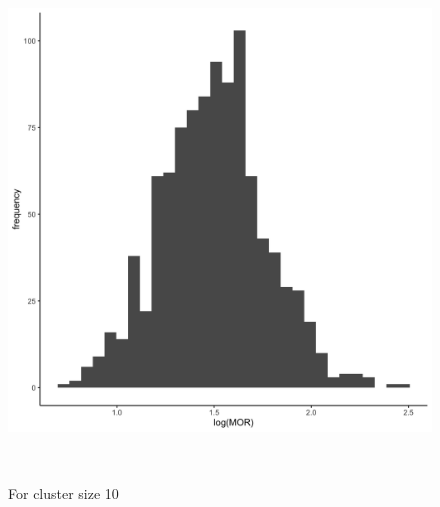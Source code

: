 \documentclass[
  letterpaper,
  DIV=11,
  numbers=noendperiod,
  titlepage]{scrartcl}
\begin{document}
\begin{figure}
\begin{minipage}[t]{0.50\linewidth}
{{\includegraphics{../../plots/two-lvl-ran-int/low-prev/hist_100_10_two_lvl_low_prev.png}

}

\caption{For cluster size 10}

}

\end{minipage}%
\newline
\begin{minipage}[t]{\linewidth}

{\centering 

~

}

\end{minipage}%
\newline
\begin{minipage}[t]{0.50\linewidth}

{\centering 

\raisebox{-\height}{

}}
\end{minipage}
\end{figure}
\end{document}
